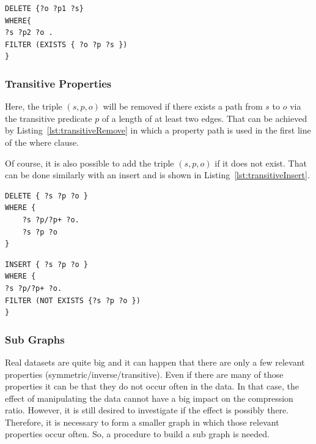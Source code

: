 \begin{lstlisting}[captionpos=b, caption=SPARQL update for removing triples with the inverse properties p1 and p2., label=lst:inverseDelete,
basicstyle=\ttfamily,frame=single,float=hbt,]
DELETE {?o ?p1 ?s}
WHERE{
?s ?p2 ?o .
FILTER (EXISTS { ?o ?p ?s })
}
\end{lstlisting}

\subsubsection{Transitive Properties}

Here, the triple $(s,p,o)$ will be removed if there exists a path from $s$ to $o$ via the transitive predicate $p$ of a length of at least two edges. That can be achieved by Listing~\ref{lst:transitiveRemove} in which a property path is used in the first line of the where clause.

Of course, it is also possible to add the triple $(s,p,o)$ if it does not exist. That can be done similarly with an insert and is shown in Listing~\ref{lst:transitiveInsert}.

\begin{lstlisting}[captionpos=b, caption=SPARQL update for removing triples with the transitive property p., label=lst:transitiveRemove,
basicstyle=\ttfamily,frame=single,float=hbt,]
DELETE { ?s ?p ?o }
WHERE { 
	?s ?p/?p+ ?o. 
	?s ?p ?o 
}
\end{lstlisting}


\begin{lstlisting}[captionpos=b, caption=SPARQL update for adding triples with the transitive property p., label=lst:transitiveInsert,
basicstyle=\ttfamily,frame=single,float=hbt,]
INSERT { ?s ?p ?o }
WHERE { 
?s ?p/?p+ ?o. 
FILTER (NOT EXISTS {?s ?p ?o })
}
\end{lstlisting}

\subsubsection{Sub Graphs}\label{sec:implementationSubGraphs}

Real datasets are quite big and it can happen that there are only a few relevant properties (symmetric/inverse/transitive). Even if there are many of those properties it can be that they do not occur often in the data. In that case, the effect of manipulating the data cannot have a big impact on the compression ratio. However, it is still desired to investigate if the effect is possibly there. Therefore, it is necessary to form a smaller graph in which those relevant properties occur often. So, a procedure to build a sub graph is needed.

